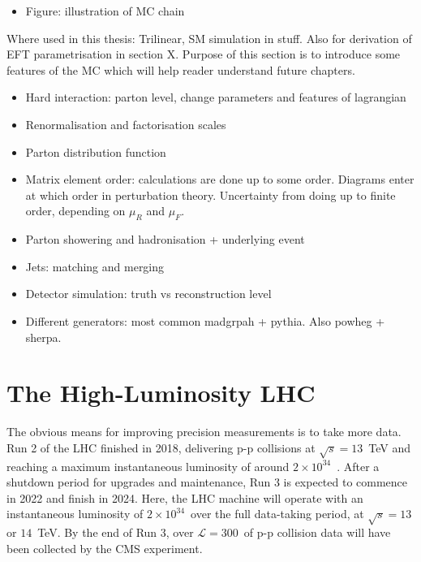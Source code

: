 \begin{itemize}
    \item Figure: illustration of MC chain
\end{itemize}

Where used in this thesis: Trilinear, SM simulation in \Hgg stuff. Also for derivation of EFT parametrisation in section X. Purpose of this section is to introduce some features of the MC which will help reader understand future chapters.

\begin{itemize}
    \item Hard interaction: parton level, change parameters and features of lagrangian
    \item Renormalisation and factorisation scales
    \item Parton distribution function
    \item Matrix element order: calculations are done up to some order. Diagrams enter at which order in perturbation theory. Uncertainty from doing up to finite order, depending on $\mu_R$ and $\mu_F$.
    \item Parton showering and hadronisation + underlying event
    \item Jets: matching and merging
    \item Detector simulation: truth vs reconstruction level
    \item Different generators: most common madgrpah + pythia. Also powheg + sherpa.
\end{itemize}

\newpage
\section{The High-Luminosity LHC}
The obvious means for improving precision measurements is to take more data. Run 2 of the LHC finished in 2018, delivering p-p collisions at $\sqrt{s}=13$~TeV and reaching a maximum instantaneous luminosity of around $2\times10^{34}$~\lumi. After a shutdown period for upgrades and maintenance, Run 3 is expected to commence in 2022 and finish in 2024. Here, the LHC machine will operate with an instantaneous luminosity of $2\times10^{34}$~\lumi over the full data-taking period, at $\sqrt{s}=13$ or $14$~TeV. By the end of Run 3, over $\mathcal{L}=300$~\fbinv of p-p collision data will have been collected by the CMS experiment.

